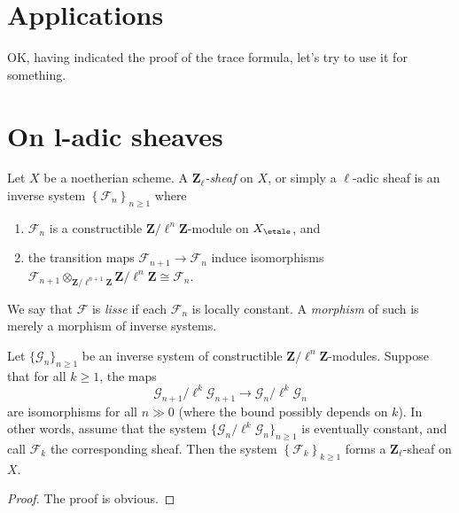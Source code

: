 \section{Applications}
\label{section-applications}

\noindent
OK, having indicated the proof of the trace formula, let's try to use it
for something.





\section{On l-adic sheaves}
\label{section-l-adic-sheaves}

\begin{definition}
\label{definition-l-adic-sheaf}
Let $X$ be a noetherian scheme. A
{\it $\mathbf{Z}_\ell$-sheaf} on $X$, or simply a
{$\ell$-adic sheaf} is an
inverse system $\left\{\mathcal{F}_n\right\}_{n\geq 1}$ where
\begin{enumerate}
\item
$\mathcal{F}_n$ is a constructible $\mathbf{Z}/\ell^n\mathbf{Z}$-module on
$X_\etale$, and
\item
the transition maps $\mathcal{F}_{n+1}\to \mathcal{F}_n$ induce isomorphisms
$\mathcal{F}_{n+1} \otimes_{\mathbf{Z}/\ell^{n+1}\mathbf{Z}}
\mathbf{Z}/\ell^n\mathbf{Z} \cong \mathcal{F}_n$.
\end{enumerate}
We say that $\mathcal{F}$ is {\it lisse} if each $\mathcal{F}_n$ is locally
constant. A {\it morphism} of such is merely a morphism of inverse systems.
\end{definition}

\begin{lemma}
\label{lemma-eventually-constant}
Let $\{\mathcal{G}_n\}_{n\geq 1}$ be an inverse system of constructible
$\mathbf{Z}/\ell^n\mathbf{Z}$-modules.
Suppose that for all $k\geq 1$, the maps
$$
\mathcal{G}_{n+1}/\ell^k \mathcal{G}_{n+1}\to \mathcal{G}_n /\ell^k
\mathcal{G}_n
$$
are isomorphisms for all $n\gg 0$ (where the bound possibly depends on $k$).
In other words, assume that the system
$\{\mathcal{G}_n/\ell^k\mathcal{G}_n\}_{n\geq 1}$
is eventually constant, and call $\mathcal{F}_k$ the corresponding sheaf.
Then the system $\left\{\mathcal{F}_k\right\}_{k\geq 1}$ forms a
$\mathbf{Z}_\ell$-sheaf on $X$.
\end{lemma}

\begin{proof}
The proof is obvious.
\end{proof}

